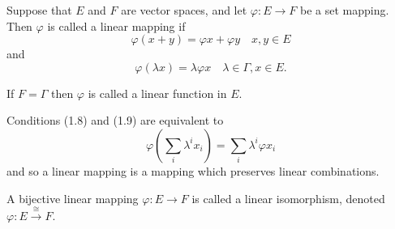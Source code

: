 Suppose that $E$ and $F$ are vector spaces, and let $\varphi: E \to F$ be a set mapping. Then $\varphi$ is called a linear mapping if
$$\varphi(x + y) = \varphi x + \varphi y \quad x, y \in E$$
and
$$\varphi(\lambda x) = \lambda \varphi x \quad \lambda \in \Gamma, x \in E.$$

If $F = \Gamma$ then $\varphi$ is called a linear function in $E$.

Conditions (1.8) and (1.9) are equivalent to
$$\varphi\left( \sum_i \lambda^i x_i \right) = \sum_i \lambda^i \varphi x_i$$
and so a linear mapping is a mapping which preserves linear combinations.

A bijective linear mapping $\varphi: E \to F$ is called a linear isomorphism, denoted $\varphi: E \xrightarrow{\cong} F$.
